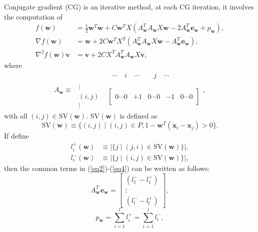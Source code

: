 \documentclass[11pt, oneside]{article}   	%
\newcommand{\norm}[1]{|#1|}
\def\bx{{\boldsymbol x}}
\def\bv{{\boldsymbol v}}
\def\bw{{\boldsymbol w}}
\def\bv{{\boldsymbol v}}
\def\be{{\boldsymbol e}}
\begin{document}
Conjugate gradient (CG) is an iterative method, at each CG iteration, it involves the computation of 
\begin{align}
f(\bw) &=\frac{1}{2}{\bw}^T{\bw}+C{\bw}^TX(A_{\bw}^TA_{\bw} X \bw - 2A_{\bw}^T\be_{\bw}+p_{\bw}),\label{eq2}\\
\nabla f(\bw) &= \bw + 2C{\bw}^TX^T(A_{\bw}^TA_{\bw}X\bw-A_{\bw}^T\be_{\bw}),\label{eq3}\\
\nabla^2 f(\bw)\bv &= \bv + 2CX^TA_{\bw}^TA_{\bw}X\bv,\label{eq4}
\end{align}
 where \begin{equation*}
A_{\bw}\equiv
\left.\begin{array}{cc}  &
\left.\begin{array}{ccccc}~\cdots~ &i & ~\cdots~ &
	\quad j &~ \cdots\end{array}\right. \\

\left.\begin{array}{c}\vdots \\
	(i,j) \\
	\vdots\end{array}\right.
& \left[\begin{array}{ccccc} \\
0 \cdots 0 & +1 &0 \cdots 0 & -1 &0 \cdots 0 \\
&
\end{array}\right]\end{array}\right.,
\end{equation*}
with all $(i,j) \in \text{SV}(\bw)$. SV$(\bw)$ is defined as 
\[\text{SV}(\bw) \equiv \{(i,j) \mid (i,j) \in P, 1-\bw^T(\bx_i-\bx_j) > 0\}.\] 
If define
\begin{align*}
	l_i^+(\bw)&\equiv \norm{\{j\mid (j,i)\in \text{SV}(\bw) \}},\\
	l_i^-(\bw)&\equiv \norm{\{j\mid (i,j)\in \text{SV}(\bw) \}},
\end{align*}
then the common terms in (\ref{eq2})-(\ref{eq4}) can be written as follows:
\begin{equation}\label{eq5}
	A_\bw^T\be_\bw = 
	\left[\begin{array}{c}
	(l_{1}^--l_{1}^+) \\
	\vdots \\
	(l_{l}^--l_{l}^+)
	\end{array}\right],
\end{equation}
\begin{equation}\label{eq6}
	p_\bw
	=\sum_{i=1}^l l_i^+
	=\sum_{i=1}^l l_i^-,
\end{equation}
\end{document}
